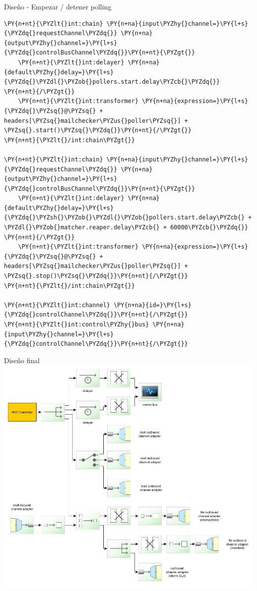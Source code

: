 \documentclass{beamer}
\begin{document}
\begin{frame}[fragile]{Diseño - Empezar / detener polling}
\begin{Verbatim}[fontsize=\tiny,commandchars=\\\{\}]
\PY{n+nt}{\PYZlt{}int:chain} \PY{n+na}{input\PYZhy{}channel=}\PY{l+s}{\PYZdq{}requestChannel\PYZdq{}} \PY{n+na}{output\PYZhy{}channel=}\PY{l+s}{\PYZdq{}controlBusChannel\PYZdq{}}\PY{n+nt}{\PYZgt{}}
    \PY{n+nt}{\PYZlt{}int:delayer} \PY{n+na}{default\PYZhy{}delay=}\PY{l+s}{\PYZdq{}\PYZdl{}\PYZob{}pollers.start.delay\PYZcb{}\PYZdq{}} \PY{n+nt}{/\PYZgt{}}
    \PY{n+nt}{\PYZlt{}int:transformer} \PY{n+na}{expression=}\PY{l+s}{\PYZdq{}\PYZsq{}@\PYZsq{} + headers[\PYZsq{}mailchecker\PYZus{}poller\PYZsq{}] + \PYZsq{}.start()\PYZsq{}\PYZdq{}}\PY{n+nt}{/\PYZgt{}}
\PY{n+nt}{\PYZlt{}/int:chain\PYZgt{}}

\PY{n+nt}{\PYZlt{}int:chain} \PY{n+na}{input\PYZhy{}channel=}\PY{l+s}{\PYZdq{}requestChannel\PYZdq{}} \PY{n+na}{output\PYZhy{}channel=}\PY{l+s}{\PYZdq{}controlBusChannel\PYZdq{}}\PY{n+nt}{\PYZgt{}}
    \PY{n+nt}{\PYZlt{}int:delayer} \PY{n+na}{default\PYZhy{}delay=}\PY{l+s}{\PYZdq{}\PYZsh{}\PYZob{}\PYZdl{}\PYZob{}pollers.start.delay\PYZcb{} + \PYZdl{}\PYZob{}matcher.reaper.delay\PYZcb{} + 60000\PYZcb{}\PYZdq{}} \PY{n+nt}{/\PYZgt{}}
    \PY{n+nt}{\PYZlt{}int:transformer} \PY{n+na}{expression=}\PY{l+s}{\PYZdq{}\PYZsq{}@\PYZsq{} + headers[\PYZsq{}mailchecker\PYZus{}poller\PYZsq{}] + \PYZsq{}.stop()\PYZsq{}\PYZdq{}}\PY{n+nt}{/\PYZgt{}}
\PY{n+nt}{\PYZlt{}/int:chain\PYZgt{}}

\PY{n+nt}{\PYZlt{}int:channel} \PY{n+na}{id=}\PY{l+s}{\PYZdq{}controlChannel\PYZdq{}}\PY{n+nt}{/\PYZgt{}}
\PY{n+nt}{\PYZlt{}int:control\PYZhy{}bus} \PY{n+na}{input\PYZhy{}channel=}\PY{l+s}{\PYZdq{}controlChannel\PYZdq{}}\PY{n+nt}{/\PYZgt{}}
\end{Verbatim}
\end{frame}

\begin{frame}{Diseño final}
\includegraphics[width=0.7\linewidth]{sp-int-99}
\end{frame}
\end{document}
